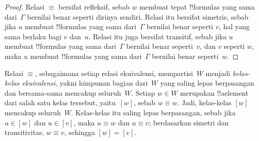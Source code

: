 \documentclass[../../../include/open-logic-section]{subfiles}
\begin{document}
\begin{proof}
  Relasi $\equiv$ bersifat refleksif, sebab $w$ membuat tepat
  !!{formula}s yang sama dari~$\Gamma$ bernilai benar seperti dirinya sendiri.
  Relasi itu bersifat simetris, sebab jika $u$ membuat !!{formula}s yang sama
  dari~$\Gamma$ bernilai benar seperti $v$, hal yang sama berlaku bagi $v$
  dan~$u$. Relasi itu juga bersifat transitif, sebab jika $u$ membuat
  !!{formula}s yang sama dari~$\Gamma$ bernilai benar seperti~$v$, dan $v$
  seperti $w$, maka $u$ membuat !!{formula}s yang sama dari~$\Gamma$ bernilai
  benar seperti~$w$.
\end{proof}

Relasi $\equiv$, sebagaimana setiap relasi ekuivalensi, mempartisi~$W$ menjadi
\emph{kelas-kelas ekuivalensi}, yakni himpunan bagian dari~$W$ yang saling lepas
berpasangan dan bersama-sama mencakup seluruh~$W$. Setiap $w \in W$ merupakan
!!a{element} dari salah satu kelas tersebut, yaitu~$[w]$, sebab $w \equiv w$.
Jadi, kelas-kelas $[w]$ mencakup seluruh~$W$. Kelas-kelas itu saling lepas
berpasangan, sebab jika $u \in [w]$ dan $u \in [v]$, maka $u \equiv w$ dan
$u \equiv v$; berdasarkan simetri dan transitivitas, $w \equiv v$, sehingga
$[w] = [v]$.
\end{document}

